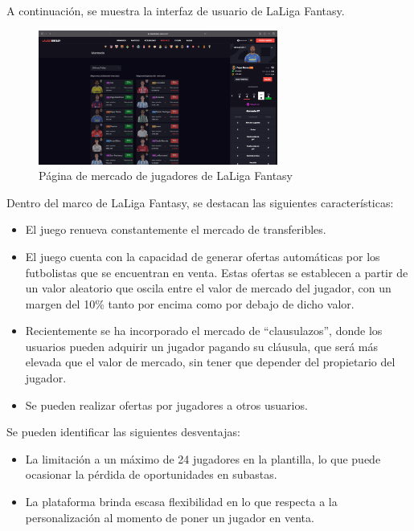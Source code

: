 A continuación, se muestra la interfaz de usuario de LaLiga Fantasy.
\begin{figure}[H]
    \centering
    \includegraphics[width=0.7\textwidth]{figures/4-Estudio-viabilidad/4_LaLigaFantasy.png}
    \caption{Página de mercado de jugadores de LaLiga Fantasy}
    \label{fig:la_liga_fantasy}
    \hypertarget{fig:la_liga_fantasy}{}
\end{figure}

Dentro del marco de LaLiga Fantasy, se destacan las siguientes características:
\begin{itemize}
    \item El juego renueva constantemente el mercado de transferibles.
    \item El juego cuenta con la capacidad de generar ofertas automáticas por los futbolistas que se encuentran en venta. Estas ofertas se establecen a partir de un valor aleatorio que oscila entre el valor de mercado del jugador, con un margen del 10\% tanto por encima como por debajo de dicho valor.
    \item Recientemente se ha incorporado el mercado de ``clausulazos'', donde los usuarios pueden adquirir un jugador pagando su cláusula, que será más elevada que el valor de mercado, sin tener que depender del propietario del jugador.
    \item Se pueden realizar ofertas por jugadores a otros usuarios.
\end{itemize}

Se pueden identificar las siguientes desventajas:
\begin{itemize}
    \item La limitación a un máximo de 24 jugadores en la plantilla, lo que puede ocasionar la pérdida de oportunidades en subastas.
    \item La plataforma brinda escasa flexibilidad en lo que respecta a la personalización al momento de poner un jugador en venta.
\end{itemize}

